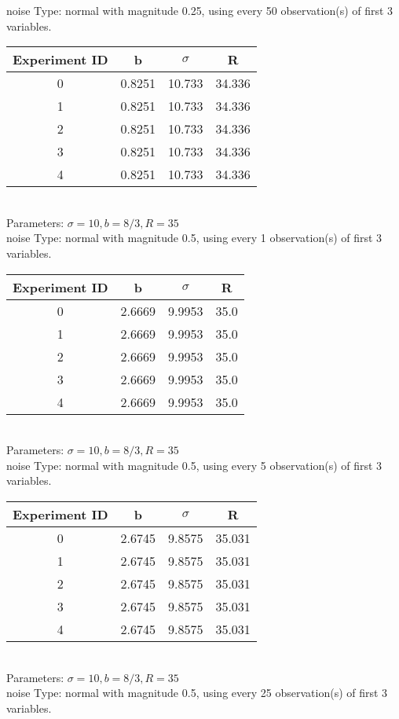 \begin{multicols}{3}
noise Type: normal with magnitude 0.25, using every 50 observation(s) of first 3 variables.\\
\begin{tabular}{cccc}
\hline Experiment ID & b & $\sigma$ & R \\ \hline 
0 & 0.8251 & 10.733 & 34.336\\ \hline 
 1 & 0.8251 & 10.733 & 34.336\\ \hline 
 2 & 0.8251 & 10.733 & 34.336\\ \hline 
 3 & 0.8251 & 10.733 & 34.336\\ \hline 
 4 & 0.8251 & 10.733 & 34.336\\ \hline 
 \end{tabular}\\
Parameters: $\sigma=10, b=8/3, R=35$\\
noise Type: normal with magnitude 0.5, using every 1 observation(s) of first 3 variables.\\
\begin{tabular}{cccc}
\hline Experiment ID & b & $\sigma$ & R \\ \hline 
0 & 2.6669 & 9.9953 & 35.0\\ \hline 
 1 & 2.6669 & 9.9953 & 35.0\\ \hline 
 2 & 2.6669 & 9.9953 & 35.0\\ \hline 
 3 & 2.6669 & 9.9953 & 35.0\\ \hline 
 4 & 2.6669 & 9.9953 & 35.0\\ \hline 
 \end{tabular}\\
Parameters: $\sigma=10, b=8/3, R=35$\\
noise Type: normal with magnitude 0.5, using every 5 observation(s) of first 3 variables.\\
\begin{tabular}{cccc}
\hline Experiment ID & b & $\sigma$ & R \\ \hline 
0 & 2.6745 & 9.8575 & 35.031\\ \hline 
 1 & 2.6745 & 9.8575 & 35.031\\ \hline 
 2 & 2.6745 & 9.8575 & 35.031\\ \hline 
 3 & 2.6745 & 9.8575 & 35.031\\ \hline 
 4 & 2.6745 & 9.8575 & 35.031\\ \hline 
 \end{tabular}\\
Parameters: $\sigma=10, b=8/3, R=35$\\
noise Type: normal with magnitude 0.5, using every 25 observation(s) of first 3 variables.\\

\end{multicols}
